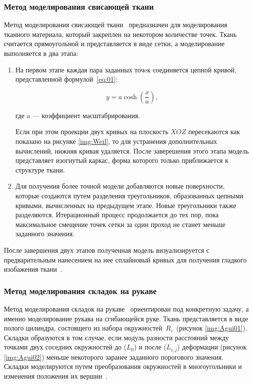 \subsubsection{Метод моделирования свисающей ткани}
Метод моделирования свисающей ткани~\cite{bib08} предназначен для моделирования
тканного материала, который закреплен на некотором количестве точек. Ткань
считается прямоугольной и представляется в виде сетки, а моделирование
выполняется в два этапа:
\begin{enumerate}[label=\arabic*)]
    \item На первом этапе каждая пара заданных точeк соединяется цепной кривой,
        представленной формулой~\ref{eq:01}:

        \begin{equation}\label{eq:01}
            y = a\cosh(\frac{x}{a}),
        \end{equation}

        где $a$ --- коэффициент масштабрирования.

        Если при этом проекции двух кривых на плоскость $XOZ$ пересекаются как
        показано на рисунке \ref{img:Weil}, то для устранения дополнительных
        вычислений, нижняя кривая удаляется. После заверешения этого этапа
        модель представляет изогнутый каркас, форма которого только приближается
        к структуре ткани. 


    \item Для получения более точной модели добавляются новые поверхности,
        которые создаются путем разделения треугольников, образованных цепными
        кривыми, вычисленных на предыдущем этапе.  Новые треугольники также
        разделяются. Итерационный процесс продолжается до тех пор, пока
        максимальное смещение точек сетки за один проход не станет меньше
        заданного значения.
\end{enumerate}

После завершения двух этапов полученная модель визуализируется с
предварительным нанесением на нее сплайновый кривых для получения
гладкого изобажения ткани~\cite{bib07, bib08}.

\subsubsection{Метод моделирования складок на рукаве}

Метод моделирования складок на рукаве~\cite{bib07} ориентирован под конкретную
задачу, а именно моделирование рукава на сгибающейся руке.  Ткань представляется
в виде полого цилиндра, состоящего из набора окружностей~$R_i$~(рисунок
\ref{img:Agui01}). Складки образуются в том случае, если модуль разности
расстояний между точками двух соседних окружностей до ($L_0$) и после
($L_{i,j}$) деформации (рисунок \ref{img:Agui02})
меньше некоторого заранее заданного порогового значения. Складки моделируются
путем преобразования окружностей в многоугольники и изменения положения их
вершин~\cite{bib07}.

